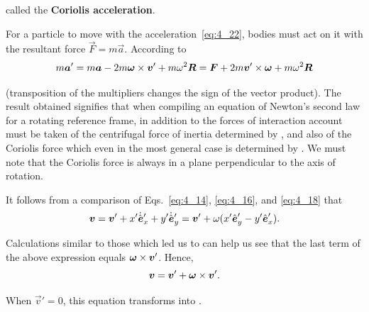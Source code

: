 \noindent
called the \textbf{Coriolis acceleration}.

For a particle to move with the acceleration~\eqref{eq:4_22}, bodies must act on it with the resultant force $\vec{F}=m\vec{a}$. According to 
\begin{equation}\label{eq:4_24}
m\boldsymbol{a}' = m\boldsymbol{a} - 2m\boldsymbol{\omega}\times\boldsymbol{v}' + m\omega^2\boldsymbol{R} = \boldsymbol{F} + 2m\boldsymbol{v}'\times\boldsymbol{\omega} + m\omega^2\boldsymbol{R}
\end{equation}

\noindent
(transposition of the multipliers changes the sign of the vector product). The result obtained signifies that when compiling an equation of Newton's second law for a rotating reference frame, in addition to the forces of interaction account must be taken of the centrifugal force of inertia determined by , and also of the Coriolis force which even in the most general case is determined by . We must note that the Coriolis force is always in a plane perpendicular to the axis of rotation.

It follows from a comparison of Eqs.~\eqref{eq:4_14}, \eqref{eq:4_16}, and \eqref{eq:4_18} that
\begin{equation*}
\boldsymbol{v} = \boldsymbol{v}' + x'\dot{\hat{\boldsymbol{e}}}_x' + y'\dot{\hat{\boldsymbol{e}}}_y' = \boldsymbol{v}' + \omega(x'\hat{\boldsymbol{e}}_{y}' - y'\hat{\boldsymbol{e}}_{x}').
\end{equation*}

\noindent
Calculations similar to those which led us to  can help us see that the last term of the above expression equals $\boldsymbol{\omega}\times\boldsymbol{v}'$. Hence,
\begin{equation}\label{eq:4_25}
\boldsymbol{v} = \boldsymbol{v}' + \boldsymbol{\omega}\times\boldsymbol{v}'.
\end{equation}

\noindent
When $\vec{v}'=0$, this equation transforms into .

